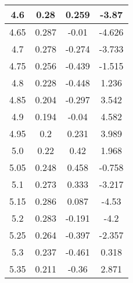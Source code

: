 \begin{multicols}{2}
\begin{longtable}{|c|c|c|c|}
    \hline
    4.6      & 0.28         & 0.259                                  & -3.87                                        \\
    \hline
    4.65     & 0.287        & -0.01                                  & -4.626                                       \\
    \hline
    4.7      & 0.278        & -0.274                                 & -3.733                                       \\
    \hline
    4.75     & 0.256        & -0.439                                 & -1.515                                       \\
    \hline
    4.8      & 0.228        & -0.448                                 & 1.236                                        \\
    \hline
    4.85     & 0.204        & -0.297                                 & 3.542                                        \\
    \hline
    4.9      & 0.194        & -0.04                                  & 4.582                                        \\
    \hline
    4.95     & 0.2          & 0.231                                  & 3.989                                        \\
    \hline
    5.0      & 0.22         & 0.42                                   & 1.968                                        \\
    \hline
    5.05     & 0.248        & 0.458                                  & -0.758                                       \\
    \hline
    5.1      & 0.273        & 0.333                                  & -3.217                                       \\
    \hline
    5.15     & 0.286        & 0.087                                  & -4.53                                        \\
    \hline
    5.2      & 0.283        & -0.191                                 & -4.2                                         \\
    \hline
    5.25     & 0.264        & -0.397                                 & -2.357                                       \\
    \hline
    5.3      & 0.237        & -0.461                                 & 0.318                                        \\
    \hline
    5.35     & 0.211        & -0.36                                  & 2.871                                        \\

\end{longtable}
\end{multicols}
